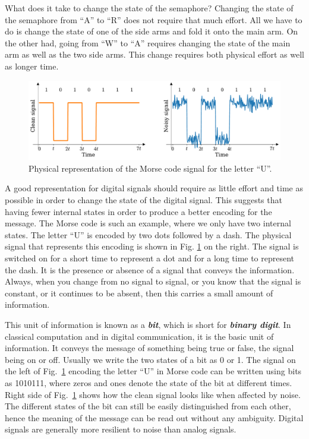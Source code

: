 What does it take to change the state of the semaphore?
Changing the state of the semaphore from ``A'' to ``R'' does not require that much effort.
All we have to do is change the state of one of the side arms and fold it onto the main arm.
On the other had, going from ``W'' to ``A'' requires changing the state of the main arm as well as the two side arms.
This change requires both physical effort as well as longer time.

\begin{figure}[t]
    \centering
    \includegraphics[width=\textwidth]{lesson1/1-3_morse_signal.pdf}
    \caption[Morse code signal]{Physical representation of the Morse code signal for the letter ``U''.}
    \label{fig:1-3_morse_signal}
\end{figure}

A good representation for digital signals should require as little effort and time as possible in order to change the state of the digital signal.
This suggests that having fewer internal states in order to produce a better encoding for the message.
The Morse code is such an example, where we only have two internal states.
The letter ``U'' is encoded by two dots followed by a dash.
The physical signal that represents this encoding is shown in Fig. \ref{fig:1-3_morse_signal} on the right.
The signal is switched on for a short time to represent a dot and for a long time to represent the dash.
It is the presence or absence of a signal that conveys the information.
Always, when you change from no signal to signal, or you know that the signal is constant, or it continues to be absent, then this carries a small amount of information.

This unit of information is known as a \textit{\textbf{bit}}, which is short for \textit{\textbf{binary digit}}.
In classical computation and in digital communication, it is the basic unit of information.
It conveys the message of something being true or false, the signal being on or off.
Usually we write the two states of a bit as 0 or 1.
The signal on the left of Fig.~\ref{fig:1-3_morse_signal} encoding the letter ``U'' in Morse code can be written using bits as 1010111, where zeros and ones denote the state of the bit at different times.
Right side of Fig.~\ref{fig:1-3_morse_signal} shows how the clean signal looks like when affected by noise.
The different states of the bit can still be easily distinguished from each other, hence the meaning of the message can be read out without any ambiguity.
Digital signals are generally more resilient to noise than analog signals.

